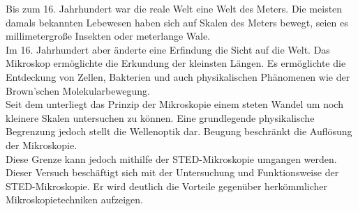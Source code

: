 Bis zum 16. Jahrhundert war die reale Welt eine Welt des Meters. 
Die meisten damals bekannten Lebewesen haben sich auf Skalen des Meters bewegt, seien es millimetergroße Insekten oder meterlange Wale.
\\
Im 16. Jahrhundert aber änderte eine Erfindung die Sicht auf die Welt. 
Das Mikroskop ermöglichte die Erkundung der kleinsten Längen. 
Es ermöglichte die Entdeckung von Zellen, Bakterien und auch physikalischen Phänomenen wie der Brown'schen Molekularbewegung.
\\
Seit dem unterliegt das Prinzip der Mikroskopie einem steten Wandel um noch kleinere Skalen untersuchen zu können.
Eine grundlegende physikalische Begrenzung jedoch stellt die Wellenoptik dar.
Beugung beschränkt die Auflösung der Mikroskopie.
\\
Diese Grenze kann jedoch mithilfe der STED-Mikroskopie umgangen werden. 
\\
Dieser Versuch beschäftigt sich mit der Untersuchung und Funktionsweise der STED-Mikroskopie. Er wird deutlich die Vorteile gegenüber herkömmlicher Mikroskopietechniken aufzeigen.
